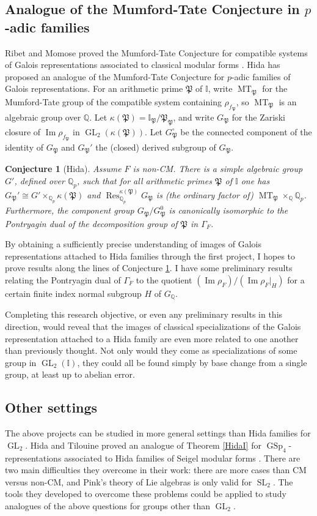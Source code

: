 \documentclass[11pt]{amsart}
\newtheorem{conj}{Conjecture}
\theoremstyle{definition}
\theoremstyle{remark}
\DeclareMathOperator{\MT}{MT}
\DeclareMathOperator{\Res}{Res}
\def\I{\mathbb{I}}
\def\Pp{\mathfrak{P}}
\def\Q{\mathbb{Q}}
\DeclareMathOperator{\GL}{GL}
\DeclareMathOperator{\GSp}{GSp}
\DeclareMathOperator{\im}{Im}
\DeclareMathOperator{\SL}{SL}
\begin{document}
\subsection*{Analogue of the Mumford-Tate Conjecture in $p$-adic families}
Ribet and Momose proved the Mumford-Tate Conjecture for compatible systems of Galois representations associated to classical modular forms \cite{Momose81, Ribet83}.  Hida has proposed an analogue of the Mumford-Tate Conjecture for $p$-adic families of Galois representations.  For an arithmetic prime $\Pp$ of $\I$, write $\MT_\Pp$ for the Mumford-Tate group of the compatible system containing $\rho_{f_\Pp}$, so $\MT_\Pp$ is an algebraic group over $\Q$.  Let $\kappa(\Pp) = \I_\Pp/\Pp_\Pp$, and write $G_\Pp$ for the Zariski closure of $\im \rho_{f_\Pp}$ in $\GL_2(\kappa(\Pp))$.  Let $G_\Pp^\circ$ be the connected component of the identity of $G_\Pp$ and $G_\Pp'$ the (closed) derived subgroup of $G_\Pp$.

\begin{conj}[Hida]\label{p-adic MT}
Assume $F$ is non-CM.  There is a simple algebraic group $G'$, defined over $\Q_p$, such that for all arithmetic primes $\Pp$ of $\I$ one has $G_\Pp' \cong G' \times_{\Q_p} \kappa(\Pp)$ and $\Res_{\Q_p}^{\kappa(\Pp)} G_\Pp$ is (the ordinary factor of) $\MT_\Pp \times_\Q \Q_p$.  Furthermore, the component group $G_\Pp/G_\Pp^0$ is canonically isomorphic to the Pontryagin dual of the decomposition group of $\Pp$ in $\Gamma_F$.
\end{conj} 

By obtaining a sufficiently precise understanding of images of Galois representations attached to Hida families through the first project, I hopes to prove results along the lines of Conjecture \ref{p-adic MT}.  I have some preliminary results relating the Pontryagin dual of $\Gamma_F$ to the quotient $(\im \rho_F)/(\im \rho_F|_H)$ for a certain finite index normal subgroup $H$ of $G_\Q$.

Completing this research objective, or even any preliminary results in this direction, would reveal that the images of classical specializations of the Galois representation attached to a Hida family are even more related to one another than previously thought.  Not only would they come as specializations of some group in $\GL_2(\I)$, they could all be found simply by base change from a single group, at least up to abelian error.

\subsection*{Other settings}
The above projects can be studied in more general settings than Hida families for $\GL_2$.  Hida and Tilouine proved an analogue of Theorem \ref{HidaI} for $\GSp_4$-representations associated to Hida families of Seigel modular forms \cite{HidaTilouine15}.  There are two main difficulties they overcome in their work: there are more cases than CM versus non-CM, and Pink's theory of Lie algebras is only valid for $\SL_2$.  The tools they developed to overcome these problems could be applied to study analogues of the above questions for groups other than $\GL_2$.  
\end{document}
